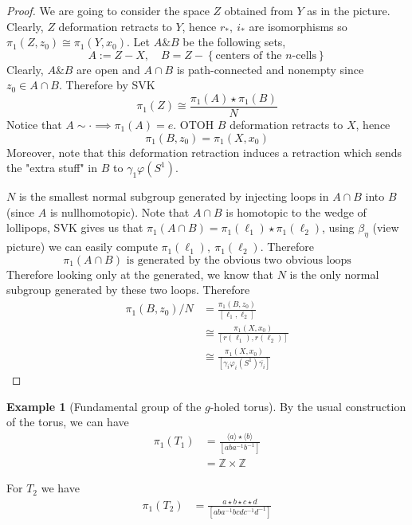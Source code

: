 \documentclass[11pt,a4paper]{article}
\theoremstyle{definition}
\newtheorem{example}[definition]{Example}
\theoremstyle{plain}
\theoremstyle{remark}
\newcommand{\Z}{\mathbb{Z}}
\renewcommand{\set}[1]{\left\{ #1 \right\}}
\newcommand{\angles}[1]{\langle #1 \rangle}
\newcommand{\1}{\mathbbm{1}}
\begin{document}
\begin{proof}
    We are going to consider the space $Z$ obtained from $Y$ as in the picture. Clearly, $Z$ deformation retracts to $Y$, hence 
    $r_*, \ i_*$ are isomorphisms so $\pi_1(Z, z_0) \cong \pi_1(Y, x_0)$. Let $A \& B$ be the following sets, 
    $$A := Z - X, \quad B  = Z - \set{\text{centers of the $n$-cells}}$$
    Clearly, $A \& B$ are open and $A \cap B$ is path-connected and nonempty since $z_0 \in A \cap B$. Therefore 
    by SVK 
    $$\pi_1(Z) \cong \frac{\pi_1(A) \star \pi_1(B)}{N}$$
    Notice that $A \sim \cdot \implies \pi_1(A) = e$. OTOH $B$ deformation retracts to $X$, hence 
    $$\pi_1(B, z_0) = \pi_1(X, x_0)$$
    Moreover, note that this deformation retraction induces a retraction which sends the "extra stuff" in $B$ to $\gamma_1 \varphi(S^1)$. 

    $N$ is the smallest normal subgroup generated by injecting loops in $A \cap B$ into $B$ (since $A$ is nullhomotopic). 
    Note that $A \cap B$ is homotopic to the wedge of lollipops, SVK gives us that $\pi_1(A \cap B) = \pi_1(\ell_1) \star \pi_1 (\ell_2)$, 
    using $\beta_\eta$ (view picture) we can easily compute $\pi_1(\ell_1), \ \pi_1(\ell_2)$. Therefore 
    $$\pi_1(A \cap B) \text{ is generated by the obvious two obvious loops}$$
    Therefore looking only at the generated, we know that $N$ is the only normal subgroup generated by these two loops. 
    Therefore 
    \begin{align*}
        \pi_1(B, z_0)/N &= \frac{\pi_1(B, z_0)}{[\ell_1, \ell_2]} \\
        &\cong \frac{\pi_1(X, x_0)}{[r(\ell_1), r(\ell_2)]} \\
        &\cong \frac{\pi_1(X,x_0)}{[\gamma_i \varphi_i(S^1) \overline{\gamma_i}]}
    \end{align*}
\end{proof}

\begin{example}[Fundamental group of the $g$-holed torus]
    By the usual construction of the torus, we can have 
    \begin{align*}
        \pi_1(T_1) &= \frac{\angles{a} \star \angles{b}}{[aba^{-1}b^{-1}]} \\
        &= \Z \times \Z
    \end{align*}

    For $T_2$ we have 
    \begin{align*}
        \pi_1(T_2) &= \frac{a \star b \star c \star d}{[aba^{-1}b cd c^{-1}d^{-1}]}
    \end{align*}
\end{example}
\end{document}
